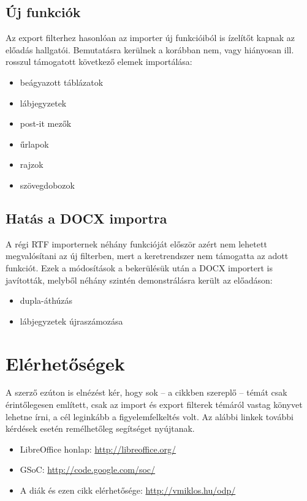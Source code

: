 \documentclass[a4paper]{report}
\begin{document}
\subsection*{Új funkciók}

Az export filterhez hasonlóan az importer új funkcióiból is ízelítőt kapnak az
előadás hallgatói. Bemutatásra kerülnek a korábban nem, vagy hiányosan ill. rosszul támogatott
következő elemek importálása:

\begin{itemize}
\item beágyazott táblázatok
\item lábjegyzetek
\item post-it mezők
\item űrlapok
\item rajzok
\item szövegdobozok
\end{itemize}

\subsection*{Hatás a DOCX importra}

A régi RTF importernek néhány funkcióját először azért nem lehetett megvalósítani az új filterben, mert a keretrendszer nem támogatta az adott funkciót. Ezek a módosítások a bekerülésük után a DOCX importert is javították, melyből néhány szintén demonstrálásra került az előadáson:

\begin{itemize}
\item dupla-áthúzás
\item lábjegyzetek újraszámozása
\end{itemize}

\section{Elérhetőségek}

A szerző ezúton is elnézést kér, hogy sok -- a cikkben szereplő -- témát
csak érintőlegesen említett, csak az import és export filterek témáról
vastag könyvet lehetne írni, a cél leginkább a figyelemfelkeltés volt.
Az alábbi linkek további kérdések esetén remélhetőleg segítséget
nyújtanak.

\begin{itemize}
\item LibreOffice honlap: \url{http://libreoffice.org/}
\item GSoC: \url{http://code.google.com/soc/}
\item A diák és ezen cikk elérhetősége: \url{http://vmiklos.hu/odp/}
\end{itemize}
\end{document}
